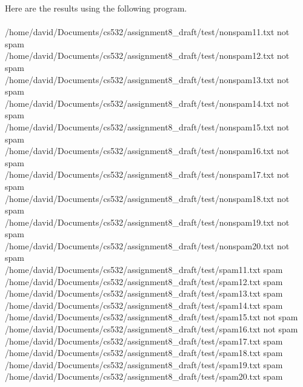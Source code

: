 \documentclass[10pt,letterpaper]{article}
\begin{document}
Here are the results using the following program.\\
\\
/home/david/Documents/cs532/assignment8\_draft/test/nonspam11.txt not spam\\
/home/david/Documents/cs532/assignment8\_draft/test/nonspam12.txt not spam\\
/home/david/Documents/cs532/assignment8\_draft/test/nonspam13.txt not spam\\
/home/david/Documents/cs532/assignment8\_draft/test/nonspam14.txt not spam\\
/home/david/Documents/cs532/assignment8\_draft/test/nonspam15.txt not spam\\
/home/david/Documents/cs532/assignment8\_draft/test/nonspam16.txt not spam\\
/home/david/Documents/cs532/assignment8\_draft/test/nonspam17.txt not spam\\
/home/david/Documents/cs532/assignment8\_draft/test/nonspam18.txt not spam\\
/home/david/Documents/cs532/assignment8\_draft/test/nonspam19.txt not spam\\
/home/david/Documents/cs532/assignment8\_draft/test/nonspam20.txt not spam\\
/home/david/Documents/cs532/assignment8\_draft/test/spam11.txt spam\\
/home/david/Documents/cs532/assignment8\_draft/test/spam12.txt spam\\
/home/david/Documents/cs532/assignment8\_draft/test/spam13.txt spam\\
/home/david/Documents/cs532/assignment8\_draft/test/spam14.txt spam\\
/home/david/Documents/cs532/assignment8\_draft/test/spam15.txt not spam\\
/home/david/Documents/cs532/assignment8\_draft/test/spam16.txt not spam\\
/home/david/Documents/cs532/assignment8\_draft/test/spam17.txt spam\\
/home/david/Documents/cs532/assignment8\_draft/test/spam18.txt spam\\
/home/david/Documents/cs532/assignment8\_draft/test/spam19.txt spam\\
/home/david/Documents/cs532/assignment8\_draft/test/spam20.txt spam\\
\\
\pagebreak
\end{document}
